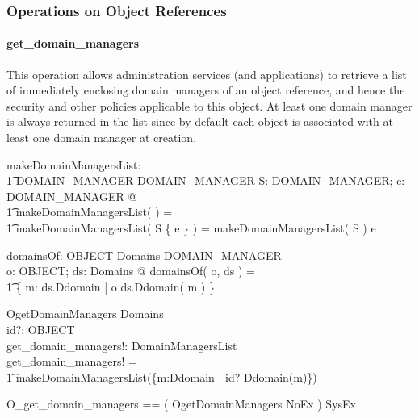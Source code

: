 \subsubsection{Operations on Object References} \label{sec:objects:ops}



\paragraph{get\_domain\_managers}
This operation allows administration services (and applications) to retrieve a
list of immediately enclosing domain managers of an object reference, and hence
the security and other policies applicable to this object.  At least one domain
manager is always returned in the list since by default each object is
associated with at least one domain manager at creation.
\begin{axdef}
  makeDomainManagersList: \\
  \t1 \power DOMAIN\_MANAGER \fun \seq DOMAIN\_MANAGER
  \where
  \forall S: \power DOMAIN\_MANAGER; e: DOMAIN\_MANAGER @ \\
  \t1 makeDomainManagersList( \emptyset ) = \langle \rangle \land \\
  \t1 makeDomainManagersList( S \cup \{ e \} ) = makeDomainManagersList( S )
  \cat \langle e \rangle \\ 
\end{axdef}
\begin{axdef}
  domainsOf: OBJECT \cross Domains \fun \power DOMAIN\_MANAGER \\
  \where
  \forall o: OBJECT; ds: Domains @ domainsOf( o, ds ) = \\
  \t1 \{ m: \dom ds.Ddomain | o \in ds.Ddomain( m ) \}
\end{axdef}

\begin{schema}{OgetDomainManagers}
  \Xi Domains \\
  id?: OBJECT \\
  get\_domain\_managers!: DomainManagersList \\
  \where
  get\_domain\_managers! = \\
  \t1 makeDomainManagersList(\{m:\dom Ddomain | id? \in Ddomain(m)\}) \\ 
\end{schema}
\begin{zed}
  O\_get\_domain\_managers == ( OgetDomainManagers \land NoEx ) \lor SysEx \\
\end{zed}

